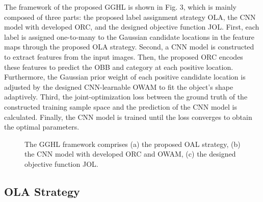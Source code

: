 The framework of the proposed GGHL is shown in Fig. 3, which is mainly composed of three parts: the proposed label assignment strategy OLA, the CNN model with developed ORC, and the designed objective function JOL. First, each label is assigned one-to-many to the Gaussian candidate locations in the feature maps through the proposed OLA strategy. Second, a CNN model is constructed to extract features from the input images. Then, the proposed ORC encodes these features to predict the OBB and category at each positive location. Furthermore, the Gaussian prior weight of each positive candidate location is adjusted by the designed CNN-learnable OWAM to fit the object’s shape adaptively. Third, the joint-optimization loss between the ground truth of the constructed training sample space and the prediction of the CNN model is calculated. Finally, the CNN model is trained until the loss converges to obtain the optimal parameters.
\begin{figure}[tbp]
	\vspace{-0.5em}
	\centering
	\vspace{-1em}
	\caption{The GGHL framework comprises (a) the proposed OAL strategy, (b) the CNN model with developed ORC and OWAM, (c) the designed objective function JOL.}\label{fig:3}
	\vspace{-0.5em}
\end{figure} 

\vspace{-0.5em}
\subsection{OLA Strategy}

